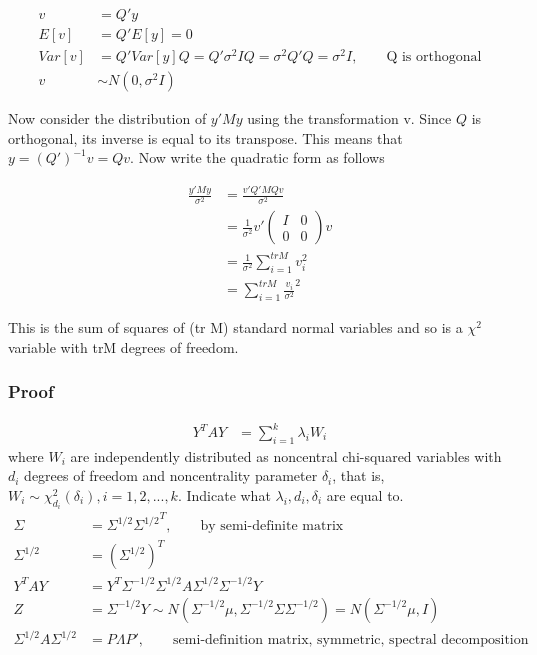\documentclass[11pt]{article} %
\begin{document}
\begin{itemize}
\begin{align*}
	v &= Q'y \\
	E[v] &= Q' E[y] = 0 \\
	Var[v] &= Q' Var[y] Q = Q' \sigma^2 I Q = \sigma^2 Q'Q = \sigma^2 I, \qquad \text{Q is orthogonal} \\
	v & \sim N(0, \sigma^2 I)
\end{align*}	

Now consider the distribution of $y'M y$ using the transformation v. Since $Q$ is orthogonal, its inverse is equal to its transpose. This means that $y= (Q')^{-1} v = Qv$. Now write the quadratic form as follows

\begin{align*}
	\frac{y' M y}{\sigma^2} &= \frac{v' Q' M Q v}{\sigma^2} \\
	&= \frac{1}{\sigma^2} v' \begin{pmatrix}
		I & 0 \\
		0 & 0
	\end{pmatrix} v \\
&= \frac{1}{\sigma^2} \sum_{i=1}^{tr M} v_i^2 \\
&= \sum_{i=1}^{tr M} \frac{v_i}{\sigma^2} ^2
\end{align*}	

This is the sum of squares of (tr M) standard normal variables and so is a $\chi^2$ variable with trM degrees of freedom. 


	\end{itemize}


\subsubsection{Proof}	


	\begin{align*}
		Y^T A Y &= \sum_{i=1}^k \lambda_i W_i     
	\end{align*} 
	where $W_i$ are independently distributed as noncentral chi-squared variables with $d_i$ degrees of freedom and noncentrality parameter $\delta_i$, that is, $W_i \sim \chi^2_{ d_i}(\delta_i), i =
	1, 2, ..., k$. Indicate what $\lambda_i, d_i, \delta_i$ are equal to.\\
	\begin{align*}
		\Sigma &= \Sigma^{1/2} {\Sigma^{1/2}}^T, \qquad \text{by semi-definite matrix}\\
		\Sigma^{1/2}  &= (\Sigma^{1/2} )^T \\
		Y^T A Y &= Y^T \Sigma^{-1/2} \Sigma^{1/2} A \Sigma^{1/2}  \Sigma^{-1/2} Y \\
		Z &= \Sigma^{-1/2} Y \sim N( \Sigma^{-1/2} \mu, \Sigma^{-1/2} \Sigma \Sigma^{-1/2} ) = N( \Sigma^{-1/2} \mu, I ) \\
		\Sigma^{1/2} A \Sigma^{1/2} &= P \Lambda P', \qquad \text{semi-definition matrix, symmetric, spectral decomposition}
	\end{align*} 
\end{document}
